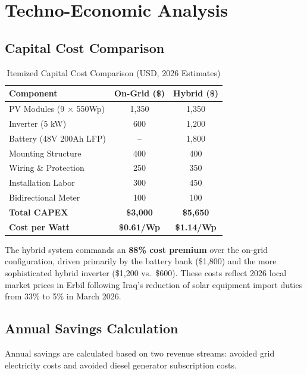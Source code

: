 \section{Techno-Economic Analysis}

\subsection{Capital Cost Comparison}

\begin{table}[H]
\centering
\caption{Itemized Capital Cost Comparison (USD, 2026 Estimates)}
\label{tab:capex}
\begin{tabular}{@{}p{5cm} c c@{}}
\toprule
\textbf{Component} & \textbf{On-Grid (\$)} & \textbf{Hybrid (\$)} \\
\midrule
PV Modules (9 $\times$ 550Wp) & 1,350 & 1,350 \\
Inverter (5 kW) & 600 & 1,200 \\
Battery (48V 200Ah LFP) & -- & 1,800 \\
Mounting Structure & 400 & 400 \\
Wiring \& Protection & 250 & 350 \\
Installation Labor & 300 & 450 \\
Bidirectional Meter & 100 & 100 \\
\midrule
\textbf{Total CAPEX} & \textbf{\$3,000} & \textbf{\$5,650} \\
\textbf{Cost per Watt} & \textbf{\$0.61/Wp} & \textbf{\$1.14/Wp} \\
\bottomrule
\end{tabular}
\end{table}

The hybrid system commands an \textbf{88\% cost premium} over the on-grid configuration, driven primarily by the battery bank (\$1,800) and the more sophisticated hybrid inverter (\$1,200 vs.\ \$600). These costs reflect 2026 local market prices in Erbil following Iraq's reduction of solar equipment import duties from 33\% to 5\% in March 2026.


\subsection{Annual Savings Calculation}

Annual savings are calculated based on two revenue streams: avoided grid electricity costs and avoided diesel generator subscription costs.

